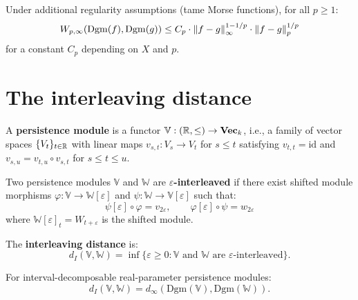 \begin{theorem}
Under additional regularity assumptions (tame Morse functions),
for all $p \geq 1$:
\[
  W_{p,\infty}(\mathrm{Dgm}(f), \mathrm{Dgm}(g)) \leq
  C_p \cdot \left\| f - g \right\|_\infty^{1 - 1/p} \cdot
  \left\| f - g \right\|_{p}^{1/p}
\]
for a constant $C_p$ depending on $X$ and $p$.
\end{theorem}

\section{The interleaving distance}
\label{sec:interleaving}

\begin{definition}
A \textbf{persistence module} is a functor $\mathbb{V} :
(\mathbb{R}, \leq) \to \mathbf{Vec}_k$, i.e., a family of vector spaces
$\{V_t\}_{t \in \mathbb{R}}$ with linear maps
$v_{s,t} : V_s \to V_t$ for $s \leq t$ satisfying $v_{t,t} = \mathrm{id}$
and $v_{s,u} = v_{t,u} \circ v_{s,t}$ for $s \leq t \leq u$.
\end{definition}

\begin{definition}
Two persistence modules $\mathbb{V}$ and $\mathbb{W}$ are
\textbf{$\varepsilon$-interleaved} if there exist shifted module
morphisms $\varphi : \mathbb{V} \to \mathbb{W}[\varepsilon]$
and $\psi : \mathbb{W} \to \mathbb{V}[\varepsilon]$ such that:
\[
  \psi[\varepsilon] \circ \varphi = v_{2\varepsilon}, \qquad
  \varphi[\varepsilon] \circ \psi = w_{2\varepsilon}
\]
where $\mathbb{W}[\varepsilon]_t = W_{t+\varepsilon}$ is the
shifted module.
\end{definition}

\begin{definition}
The \textbf{interleaving distance} is:
\[
  d_I(\mathbb{V}, \mathbb{W}) = \inf\{\varepsilon \geq 0 :
  \mathbb{V} \text{ and } \mathbb{W} \text{ are }
  \varepsilon\text{-interleaved}\}.
\]
\end{definition}

\begin{theorem}
\label{thm:isometry}
For interval-decomposable real-parameter persistence modules:
\[
  d_I(\mathbb{V}, \mathbb{W}) = d_\infty(\mathrm{Dgm}(\mathbb{V}),
  \mathrm{Dgm}(\mathbb{W})).
\]
\end{theorem}


